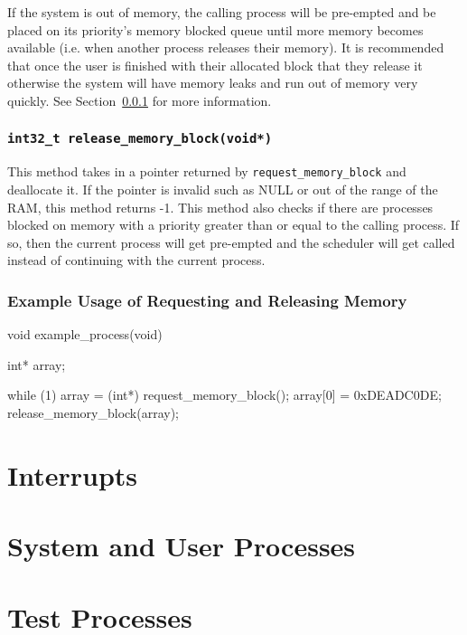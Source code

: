 \documentclass[se]{uw-wkrpt}
\begin{document}
If the system is out of memory, the calling process will be pre-empted and be placed on its priority's memory blocked queue until more memory becomes available (i.e. when another process releases their memory). It is recommended that once the user is finished with their allocated block that they release it otherwise the system will have memory leaks and run out of memory very quickly. See Section~\ref{sec:release-memory-block} for more information.

\subsubsection{\texttt{int32\_t release\_memory\_block(void*)}}
\label{sec:release-memory-block}

This method takes in a pointer returned by \texttt{request\_memory\_block} and deallocate it. If the pointer is invalid such as NULL or out of the range of the RAM, this method returns -1. This method also checks if there are processes blocked on memory with a priority greater than or equal to the calling process. If so, then the current process will get pre-empted and the scheduler will get called instead of continuing with the current process.

\subsubsection{Example Usage of Requesting and Releasing Memory}
\begin{code}
void example_process(void) {
    int* array;
    
    while (1) {
        array = (int*) request_memory_block();
        array[0] = 0xDEADC0DE;
        release_memory_block(array);
    }
}
\end{code}


\section{Interrupts}\label{sec:interupt}

\section{System and User Processes}\label{sec:proc}

\section{Test Processes}\label{sec:testproc}
\end{document}

